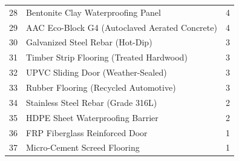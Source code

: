 \begin{tabular}{llr}
28 & Bentonite Clay Waterproofing Panel & 4 \\
29 & AAC Eco-Block G4 (Autoclaved Aerated Concrete) & 4 \\
30 & Galvanized Steel Rebar (Hot-Dip) & 3 \\
31 & Timber Strip Flooring (Treated Hardwood) & 3 \\
32 & UPVC Sliding Door (Weather-Sealed) & 3 \\
33 & Rubber Flooring (Recycled Automotive) & 3 \\
34 & Stainless Steel Rebar (Grade 316L) & 2 \\
35 & HDPE Sheet Waterproofing Barrier & 2 \\
36 & FRP Fiberglass Reinforced Door & 1 \\
37 & Micro-Cement Screed Flooring & 1 \\
\end{tabular}
